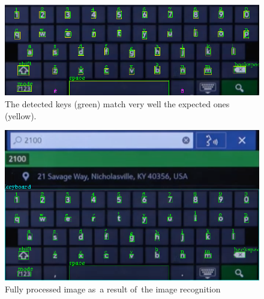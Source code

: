\begin{figure}[!hbt]
    \includegraphics[width=1\textwidth]{img/design/demo-evaluation.png}
    \caption{The detected keys (green) match very well the expected ones (yellow).}
    \label{demo-evaluation}
\end{figure}

\begin{figure}[!hbt]
    \includegraphics[width=1\textwidth]{img/design/demo-full-detection.png}
    \caption{Fully processed image as~a result of~the image recognition}
    \label{demo-full-detection}
\end{figure}
